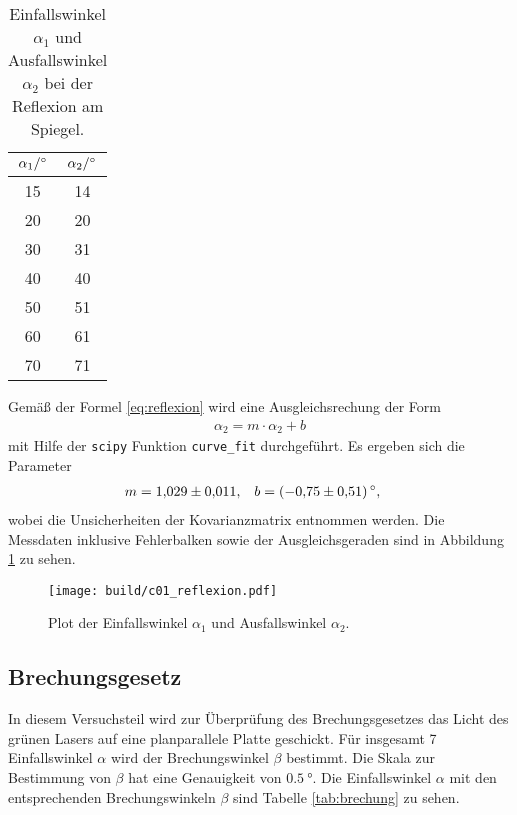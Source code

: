 \begin{table}[H]
    \centering
    \caption[short]{Einfallswinkel $\alpha_1$ und Ausfallswinkel $\alpha_2$ bei der Reflexion am Spiegel.}
    \label{tab:reflexion}
    \begin{tabular}{S S}
        \toprule
        {$\alpha_1 / \unit[]{\degree}$} & {$\alpha_2 / \unit[]{\degree}$} \\
        \midrule
        15 & 14 \\
        20 & 20 \\
        30 & 31 \\
        40 & 40 \\
        50 & 51 \\
        60 & 61 \\
        70 & 71 \\
        \bottomrule
    \end{tabular}
\end{table}

\noindent
Gemäß der Formel \eqref{eq:reflexion} wird eine Ausgleichsrechung der Form
\begin{align}
    \alpha_2 = m \cdot \alpha_2 + b
\end{align}
mit Hilfe der \texttt{scipy} \cite[]{scipy} Funktion \texttt{curve\_fit} durchgeführt.
Es ergeben sich die Parameter
\begin{align}
    m &= \num[]{1.029 +- 0.011}, & b &= (\num[]{-0.75 +- 0.51}) \, \unit[]{\degree},
\end{align}
wobei die Unsicherheiten der Kovarianzmatrix entnommen werden.
Die Messdaten inklusive Fehlerbalken sowie der Ausgleichsgeraden sind in Abbildung \ref{fig:reflexion} zu sehen.

\begin{figure}[H]
    \centering
    \texttt{[image: build/c01\_reflexion.pdf]}
    \caption[]{Plot der Einfallswinkel $\alpha_1$ und Ausfallswinkel $\alpha_2$.}
    \label{fig:reflexion}
\end{figure}






\subsection{Brechungsgesetz}
In diesem Versuchsteil wird zur Überprüfung des Brechungsgesetzes das Licht des grünen Lasers auf eine planparallele Platte geschickt.
Für insgesamt 7 Einfallswinkel $\alpha$ wird der Brechungswinkel $\beta$ bestimmt.
Die Skala zur Bestimmung von $\beta$ hat eine Genauigkeit von $\qty[]{0.5}{\degree}$.
Die Einfallswinkel $\alpha$ mit den entsprechenden Brechungswinkeln $\beta$ sind Tabelle \ref{tab:brechung} zu sehen.

